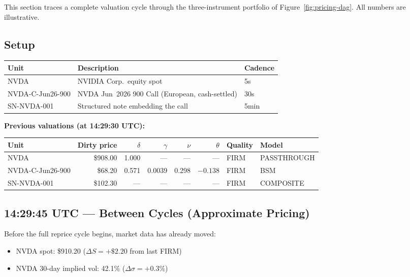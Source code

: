 \documentclass[11pt,a4paper]{article}
\begin{document}
This section traces a complete valuation cycle through the three-instrument portfolio of Figure~\ref{fig:pricing-dag}.  All numbers are illustrative.

\subsection{Setup}

\begin{center}
\small
\begin{tabular}{l l l}
\toprule
\textbf{Unit} & \textbf{Description} & \textbf{Cadence} \\
\midrule
NVDA & NVIDIA Corp.\ equity spot & 5s \\
NVDA-C-Jun26-900 & NVDA Jun~2026 900 Call (European, cash-settled) & 30s \\
SN-NVDA-001 & Structured note embedding the call & 5min \\
\bottomrule
\end{tabular}
\end{center}

\noindent\textbf{Previous valuations (at 14:29:30 UTC):}

\begin{center}
\small
\begin{tabular}{l r r r r r l l}
\toprule
\textbf{Unit} & \textbf{Dirty price} & \textbf{$\delta$} & \textbf{$\gamma$} & \textbf{$\nu$} & \textbf{$\theta$} & \textbf{Quality} & \textbf{Model} \\
\midrule
NVDA & \$908.00 & 1.000 & --- & --- & --- & FIRM & PASSTHROUGH \\
NVDA-C-Jun26-900 & \$68.20 & 0.571 & 0.0039 & 0.298 & $-0.138$ & FIRM & BSM \\
SN-NVDA-001 & \$102.30 & --- & --- & --- & --- & FIRM & COMPOSITE \\
\bottomrule
\end{tabular}
\end{center}

\subsection{14:29:45 UTC --- Between Cycles (Approximate Pricing)}

Before the full reprice cycle begins, market data has already moved:
\begin{itemize}[nosep]
\item NVDA spot: \$910.20 ($\Delta S = +\$2.20$ from last FIRM)
\item NVDA 30-day implied vol: 42.1\% ($\Delta\sigma = +0.3\%$)
\end{itemize}
\end{document}
